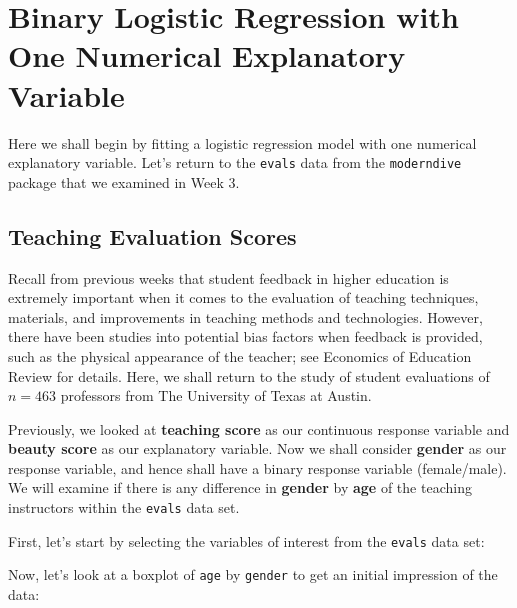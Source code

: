\documentclass[]{article}
\newenvironment{Shaded}{\begin{snugshade}}{\end{snugshade}}
\newcommand{\KeywordTok}[1]{\textcolor[rgb]{0.13,0.29,0.53}{\textbf{#1}}}
\newcommand{\StringTok}[1]{\textcolor[rgb]{0.31,0.60,0.02}{#1}}
\newcommand{\OperatorTok}[1]{\textcolor[rgb]{0.81,0.36,0.00}{\textbf{#1}}}
\newcommand{\NormalTok}[1]{#1}
\begin{document}
\newpage

\section{Binary Logistic Regression with One Numerical Explanatory
Variable}\label{binary-logistic-regression-with-one-numerical-explanatory-variable}

Here we shall begin by fitting a logistic regression model with one
numerical explanatory variable. Let's return to the \texttt{evals} data
from the \texttt{moderndive} package that we examined in Week 3.

\subsection{Teaching Evaluation
Scores}\label{teaching-evaluation-scores}

Recall from previous weeks that student feedback in higher education is
extremely important when it comes to the evaluation of teaching
techniques, materials, and improvements in teaching methods and
technologies. However, there have been studies into potential bias
factors when feedback is provided, such as the physical appearance of
the teacher; see Economics of Education Review for details. Here, we
shall return to the study of student evaluations of \(n=463\) professors
from The University of Texas at Austin.

Previously, we looked at \textbf{teaching score} as our continuous
response variable and \textbf{beauty score} as our explanatory variable.
Now we shall consider \textbf{gender} as our response variable, and
hence shall have a binary response variable (female/male). We will
examine if there is any difference in \textbf{gender} by \textbf{age} of
the teaching instructors within the \texttt{evals} data set.

First, let's start by selecting the variables of interest from the
\texttt{evals} data set:

\begin{Shaded}
\end{Shaded}

Now, let's look at a boxplot of \texttt{age} by \texttt{gender} to get
an initial impression of the data:
\end{document}
